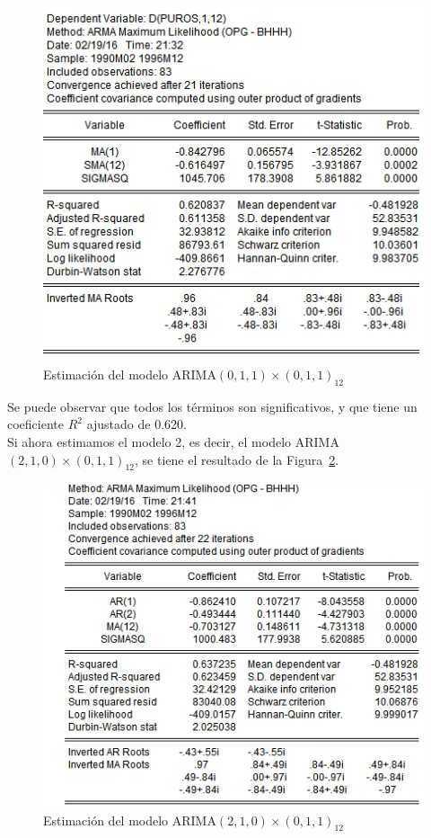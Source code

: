 \documentclass[12pt,a4paper,twoside,openright,titlepage,final]{article}
\begin{document}
\begin{figure}[tbph!]
	\centering
	\includegraphics[width=0.8\linewidth]{imagenes/puros/modelo1.png}
	\caption{Estimación del modelo ARIMA$(0,1,1)\times(0,1,1)_{12}$}
	\label{fig:modelo1-puros}
\end{figure}

Se puede observar que todos los términos son significativos, y que tiene un coeficiente $R^2$ ajustado de 0.620.\\

Si ahora estimamos el modelo 2, es decir, el modelo ARIMA$(2,1,0)\times(0,1,1)_{12}$, se tiene el resultado de la Figura~\ref{fig:modelo2-puros}.\\

\begin{figure}[tbph!]
	\centering
	\includegraphics[width=0.8\linewidth]{imagenes/puros/modelo2.png}
	\caption{Estimación del modelo ARIMA$(2,1,0)\times(0,1,1)_{12}$}
	\label{fig:modelo2-puros}
\end{figure}
\end{document}
